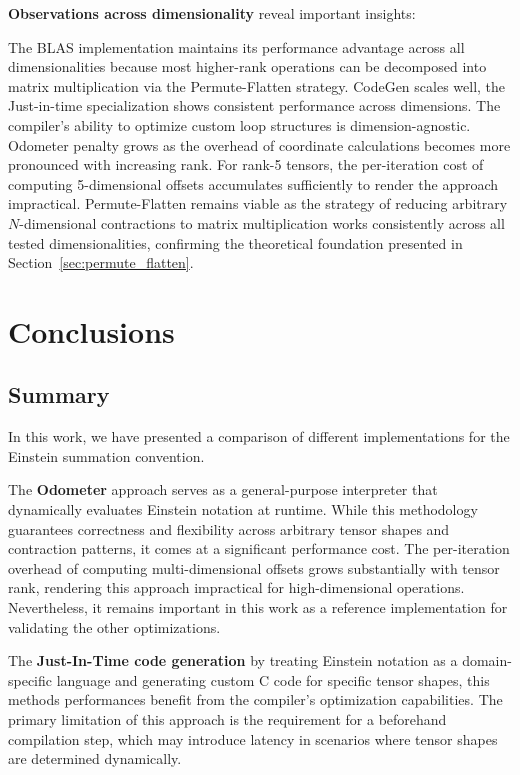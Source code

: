 \documentclass[binding=0.6cm]{sapthesis}
\begin{document}
\textbf{Observations across dimensionality} reveal important insights:

The BLAS implementation maintains its performance advantage across all dimensionalities because most higher-rank operations can be decomposed into matrix multiplication via the Permute-Flatten strategy.
CodeGen scales well, the Just-in-time specialization shows consistent performance across dimensions. The compiler's ability to optimize custom loop structures is dimension-agnostic.
Odometer penalty grows as the overhead of coordinate calculations becomes more pronounced with increasing rank. For rank-5 tensors, the per-iteration cost of computing 5-dimensional offsets accumulates sufficiently to render the approach impractical.
Permute-Flatten remains viable as the strategy of reducing arbitrary $N$-dimensional contractions to matrix multiplication works consistently across all tested dimensionalities, confirming the theoretical foundation presented in Section~\ref{sec:permute_flatten}.


\chapter{Conclusions}

\section{Summary}

In this work, we have presented a comparison of different implementations for the Einstein summation convention.

The \textbf{Odometer} approach serves as a general-purpose interpreter that dynamically evaluates Einstein notation at runtime. While this methodology guarantees correctness and flexibility across arbitrary tensor shapes and contraction patterns, it comes at a significant performance cost. The per-iteration overhead of computing multi-dimensional offsets grows substantially with tensor rank, rendering this approach impractical for high-dimensional operations. Nevertheless, it remains important in this work as a reference implementation for validating the other optimizations.

The \textbf{Just-In-Time code generation}  by treating Einstein notation as a domain-specific language and generating custom C code for specific tensor shapes, this methods performances benefit from the compiler's optimization capabilities. The primary limitation of this approach is the requirement for a beforehand compilation step, which may introduce latency in scenarios where tensor shapes are determined dynamically.
\end{document}
